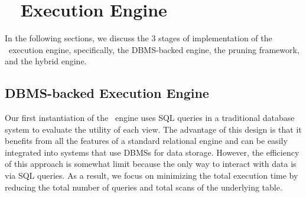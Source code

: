 \section{{\large \SeeDB\ } Execution Engine}
In the following sections, we discuss the 3 stages of implementation of the \SeeDB\
execution engine, specifically, the DBMS-backed engine, the pruning framework, and the hybrid engine.

\subsection{DBMS-backed Execution Engine}
\label{sec:dbms-exec-engine}


Our first instantiation of the \SeeDB\ engine uses SQL queries in a
traditional database system to evaluate the utility of each view.
The advantage of this design is that it benefits
from all the features of a standard relational engine and can be easily integrated into systems
that use DBMSs for data storage.
However, the efficiency of this approach is somewhat limit because
the only way to interact with data is via SQL queries.
As a result, we focus on minimizing the total execution time by reducing the
total number of queries and total scans of the underlying table.


